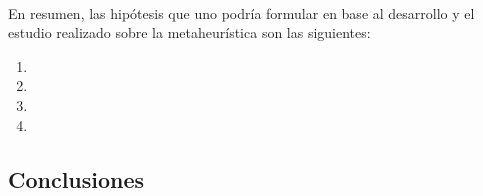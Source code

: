 \paragraph{}
En resumen, las hipótesis que uno podría formular en base al desarrollo y el estudio realizado sobre la metaheurística son las siguientes:
\begin{enumerate}
	\item
	\item
	\item
	\item
\end{enumerate}

\subsection{Conclusiones}
\paragraph{}


